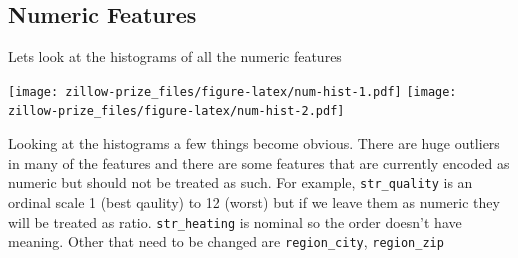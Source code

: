 \documentclass[]{book}
\newenvironment{Shaded}{\begin{snugshade}}{\end{snugshade}}
\newcommand{\KeywordTok}[1]{\textcolor[rgb]{0.13,0.29,0.53}{\textbf{#1}}}
\newcommand{\DataTypeTok}[1]{\textcolor[rgb]{0.13,0.29,0.53}{#1}}
\newcommand{\DecValTok}[1]{\textcolor[rgb]{0.00,0.00,0.81}{#1}}
\newcommand{\FloatTok}[1]{\textcolor[rgb]{0.00,0.00,0.81}{#1}}
\newcommand{\StringTok}[1]{\textcolor[rgb]{0.31,0.60,0.02}{#1}}
\newcommand{\OperatorTok}[1]{\textcolor[rgb]{0.81,0.36,0.00}{\textbf{#1}}}
\newcommand{\NormalTok}[1]{#1}
\theoremstyle{definition}
\theoremstyle{definition}
\theoremstyle{definition}
\theoremstyle{remark}
\begin{document}
\begin{Shaded}
\end{Shaded}

\subsection{Numeric Features}\label{numeric-features}

Lets look at the histograms of all the numeric features

\begin{Shaded}
\end{Shaded}

\texttt{[image: zillow-prize\_files/figure-latex/num-hist-1.pdf]}
\texttt{[image: zillow-prize\_files/figure-latex/num-hist-2.pdf]}

Looking at the histograms a few things become obvious. There are huge
outliers in many of the features and there are some features that are
currently encoded as numeric but should not be treated as such. For
example, \texttt{str\_quality} is an ordinal scale 1 (best qaulity) to
12 (worst) but if we leave them as numeric they will be treated as
ratio. \texttt{str\_heating} is nominal so the order doesn't have
meaning. Other that need to be changed are \texttt{region\_city},
\texttt{region\_zip}
\end{document}
